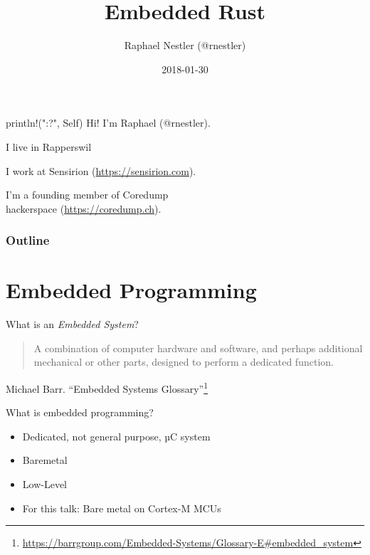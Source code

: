 \documentclass[aspectratio=1610,14pt,t]{beamer}
\title{Embedded Rust}
\date{2018-01-30}
\author{Raphael Nestler (@rnestler)}
\institute{Rust Zürichsee Meetup}
\begin{document}
\pagecolor{almostwhite}  %
\maketitle


\begin{frame}[c]{println!("{:?}", Self)}
  Hi! I'm Raphael (@rnestler).

  \pause I live in Rapperswil

  \pause I work at Sensirion ({\small \url{https://sensirion.com}}).

  \pause I'm a founding member of Coredump\\hackerspace ({\small \url{https://coredump.ch}}).
\end{frame}


\begin{frame}
  \frametitle{Outline}
  \setcounter{tocdepth}{1}
  \tableofcontents
\end{frame}



\section{Embedded Programming}

\begin{frame}[c]{What is an \emph{Embedded System}?}
  \begin{quote}
    A combination of computer hardware and software, and perhaps
    additional mechanical or other parts, designed to perform a dedicated
    function.
  \end{quote}
  Michael Barr. ``Embedded Systems Glossary''\footnote{\tiny\url{https://barrgroup.com/Embedded-Systems/Glossary-E\#embedded\_system}}
\end{frame}

\begin{frame}[c]{What is embedded programming?}
  \begin{itemize}
    \item Dedicated, not general purpose, µC system
    \item<1-> Baremetal
    \item<1-> Low-Level
    \item<2-> For this talk: Bare metal on Cortex-M MCUs
  \end{itemize}
\end{frame}
\end{document}
